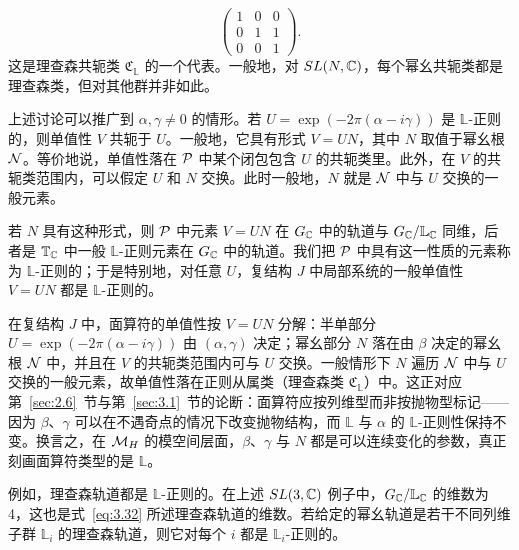 \setcounter{equation}{31}
\begin{equation}\label{eq:3.32}
  \left(\begin{matrix}1 & 0 & 0 \\
                        0 & 1 & 1 \\
                        0 & 0 & 1 \end{matrix}\right).
\end{equation}
这是理查森共轭类 ${\mathfrak C}_\mathbb{L}$ 的一个代表。一般地，对 $SL(N,{\mathbb{C}})$，每个幂幺共轭类都是理查森类，但对其他群并非如此。

上述讨论可以推广到 $\alpha,\gamma\not=0$ 的情形。若 $U=\exp(-2\pi(\alpha-i\gamma))$ 是 $\mathbb{L}$-正则的，则单值性 $V$ 共轭于 $U$。一般地，它具有形式 $V=UN$，其中 $N$ 取值于幂幺根 $\mathcal{N}$。等价地说，单值性落在 $\mathcal{P}$ 中某个闭包包含 $U$ 的共轭类里。此外，在 $V$ 的共轭类范围内，可以假定 $U$ 和 $N$ 交换。此时一般地，$N$ 就是 $\mathcal{N}$ 中与 $U$ 交换的一般元素。

若 $N$ 具有这种形式，则 $\mathcal{P}$ 中元素 $V=UN$ 在 $G_{\mathbb{C}}$ 中的轨道与 $G_{\mathbb{C}}/\mathbb{L}_{\mathbb{C}}$ 同维，后者是 ${\mathbb{T}}_{\mathbb{C}}$ 中一般 $\mathbb{L}$-正则元素在 $G_{\mathbb{C}}$ 中的轨道。我们把 $\mathcal{P}$ 中具有这一性质的元素称为 $\mathbb{L}$-正则的；于是特别地，对任意 $U$，复结构 $J$ 中局部系统的一般单值性 $V=UN$ 都是 $\mathbb{L}$-正则的。

\begin{yizhu}[物理图像补充]
在复结构 $J$ 中，面算符的单值性按 $V=UN$ 分解：半单部分 $U=\exp(-2\pi(\alpha-i\gamma))$ 由 $(\alpha,\gamma)$ 决定；幂幺部分 $N$ 落在由 $\beta$ 决定的幂幺根 $\mathcal{N}$ 中，并且在 $V$ 的共轭类范围内可与 $U$ 交换。一般情形下 $N$ 遍历 $\mathcal{N}$ 中与 $U$ 交换的一般元素，故单值性落在正则从属类（理查森类 ${\mathfrak C}_{\mathbb{L}}$）中。这正对应第~\ref{sec:2.6}~节与第~\ref{sec:3.1}~节的论断：面算符应按列维型而非按抛物型标记——因为 $\beta$、$\gamma$ 可以在不遇奇点的情况下改变抛物结构，而 $\mathbb{L}$ 与 $\alpha$ 的 $\mathbb{L}$-正则性保持不变。换言之，在 ${{\mathcal{M}}_H}$ 的模空间层面，$\beta$、$\gamma$ 与 $N$ 都是可以连续变化的参数，真正刻画面算符类型的是 $\mathbb{L}$。
\end{yizhu}

例如，理查森轨道都是 $\mathbb{L}$-正则的。在上述 $SL(3,{\mathbb{C}})$ 例子中，$G_{\mathbb{C}}/\mathbb{L}_{\mathbb{C}}$ 的维数为 4，这也是式~\eqref{eq:3.32} 所述理查森轨道的维数。若给定的幂幺轨道是若干不同列维子群 $\mathbb{L}_i$ 的理查森轨道，则它对每个 $i$ 都是 $\mathbb{L}_i$-正则的。
